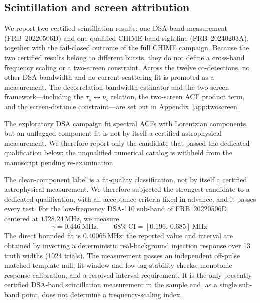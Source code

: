 \FloatBarrier
\subsection{Scintillation and screen attribution}
\label{sec:results-scintillation}

We report two certified scintillation results: one DSA-band measurement
(FRB~20220506D) and one qualified CHIME-band sightline (FRB~20240203A),
together with the fail-closed outcome of the full CHIME campaign. Because the
two certified results belong to different bursts, they do not define a
cross-band frequency scaling or a two-screen constraint. Across the twelve
co-detections, no other DSA bandwidth and no current scattering fit is promoted
as a measurement. The
decorrelation-bandwidth estimator and the two-screen framework---including the
$\tau_{s}\leftrightarrow\nu_{s}$ relation, the two-screen ACF product term,
and the screen-distance constraint---are set out in
Appendix~\ref{app:twoscreen}.

The exploratory DSA campaign fit spectral ACFs with Lorentzian components, but
an unflagged component fit is not by itself a certified astrophysical
measurement. We therefore report only the candidate that passed the dedicated
qualification below; the unqualified numerical catalog is withheld from the
manuscript pending re-examination.

The clean-component label is a fit-quality classification, not by itself a
certified astrophysical measurement. We therefore subjected the strongest
candidate to a dedicated qualification, with all acceptance criteria fixed in
advance, and it passes every test. For the low-frequency
DSA-110 sub-band of FRB~20220506D, centered at $1328.24\,$MHz, we measure
\begin{equation}
    \gamma = 0.446\ \mathrm{MHz}, \qquad
    68\%\ \mathrm{CI} = [0.196,\,0.685]\ \mathrm{MHz}.
\end{equation}
The direct bounded fit is $0.40065\,$MHz; the reported value and interval are
obtained by inverting a deterministic real-background injection response over
13 truth widths (1024 trials). The measurement passes an independent
off-pulse matched-template null, fit-window and low-lag stability checks,
monotonic response calibration, and a resolved-interval requirement. It is the
only presently certified DSA-band scintillation measurement in the sample and,
as a single sub-band point, does not determine a frequency-scaling index.

